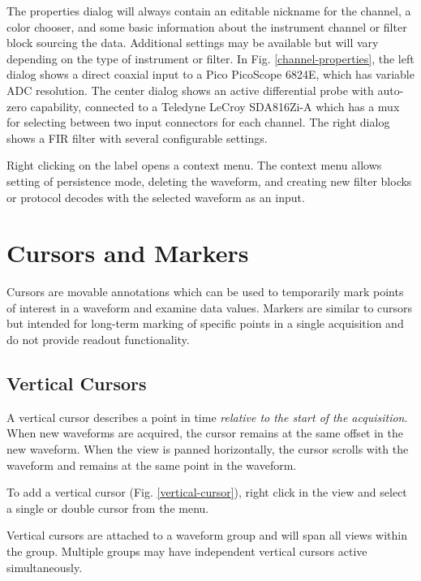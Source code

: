 The properties dialog will always contain an editable nickname for the channel, a color chooser, and some basic
information about the instrument channel or filter block sourcing the data. Additional settings may be available but
will vary depending on the type of instrument or filter. In Fig. \ref{channel-properties}, the left dialog shows a
direct coaxial input to a Pico PicoScope 6824E, which has variable ADC resolution. The center dialog shows an active
differential probe with auto-zero capability, connected to a Teledyne LeCroy SDA816Zi-A which has a mux for selecting
between two input connectors for each channel. The right dialog shows a FIR filter with several configurable settings.

Right clicking on the label opens a context menu. The context menu allows setting of persistence mode, deleting the
waveform, and creating new filter blocks or protocol decodes with the selected waveform as an input.

\section{Cursors and Markers}
\label{sec:cursors}

Cursors are movable annotations which can be used to temporarily mark points of interest in a waveform and examine data
values. Markers are similar to cursors but intended for long-term marking of specific points in a single acquisition
and do not provide readout functionality.

\subsection{Vertical Cursors}

A vertical cursor describes a point in time \emph{relative to the start of the acquisition}. When new waveforms are
acquired, the cursor remains at the same offset in the new waveform. When the view is panned horizontally, the cursor
scrolls with the waveform and remains at the same point in the waveform.

To add a vertical cursor (Fig. \ref{vertical-cursor}), right click in the view and select a single or double cursor
from the  menu.

Vertical cursors are attached to a waveform group and will span all views within the group. Multiple groups may have
independent vertical cursors active simultaneously.


